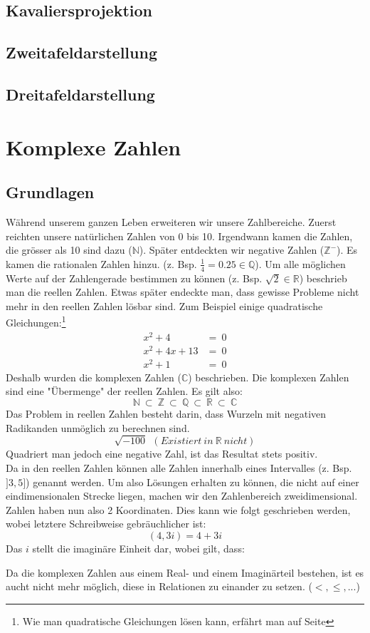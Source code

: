 \documentclass[12pt,a4paper]{scrbook}
\begin{document}
\section{Kavaliersprojektion}
\section{Zweitafeldarstellung}
\section{Dreitafeldarstellung}


\chapter{Komplexe Zahlen}
\section{Grundlagen}
Während unserem ganzen Leben erweiteren wir unsere Zahlbereiche. Zuerst
reichten unsere natürlichen Zahlen von 0 bis 10. Irgendwann kamen die Zahlen,
die grösser als 10 sind dazu ($\mathbb{N}$). Später entdeckten wir
negative Zahlen ($\mathbb{Z}^-$). Es kamen die rationalen Zahlen hinzu.
(z. Bsp. $\frac{1}{4} = 0.25 \in \mathbb{Q}$). Um alle möglichen Werte auf
der Zahlengerade bestimmen zu können (z. Bsp. $\sqrt{2} \in \mathbb{R}$)
beschrieb man die reellen Zahlen. Etwas später endeckte man, dass
gewisse Probleme nicht mehr in den reellen Zahlen lösbar sind.
Zum Beispiel einige quadratische Gleichungen:\footnote{Wie man quadratische Gleichungen lösen kann,
erfährt man auf Seite \pageref{quadratische_gleichungen}}
\begin{eqnarray*}
x^2+4 & = ~ 0\\
x^2+4x+13 & = ~ 0\\
x^2+1 & = ~ 0
\end{eqnarray*}
Deshalb wurden die komplexen Zahlen ($\mathbb{C}$) beschrieben. Die komplexen
Zahlen sind eine "Übermenge" der reellen Zahlen. Es gilt also:
\[\mathbb{N} ~ \subset ~ \mathbb{Z} ~ \subset ~ \mathbb{Q} ~ \subset ~ \mathbb{R} ~ \subset ~ \mathbb{C}\]
Das Problem in reellen Zahlen besteht darin, dass Wurzeln mit negativen
Radikanden unmöglich zu berechnen sind.
\[\sqrt{-100} ~~ (Existiert~in~\mathbb{R}~nicht)\]
Quadriert man jedoch eine negative Zahl, ist das Resultat stets positiv.\\
Da in den reellen Zahlen können alle Zahlen innerhalb eines Intervalles (z. Bsp.
$]3, 5]$) genannt werden. Um also Lösungen erhalten zu können, die nicht auf
einer eindimensionalen Strecke liegen, machen wir den Zahlenbereich zweidimensional.
Zahlen haben nun also 2 Koordinaten. Dies kann wie folgt geschrieben werden, wobei
letztere Schreibweise gebräuchlicher ist:
\[(4, 3i) = 4 + 3i\]
Das $i$ stellt die imaginäre Einheit dar, wobei gilt, dass:
\begin{center}
\fbox{\parbox{4cm}{\[i^2 = -1\]}}
\end{center}
Da die komplexen Zahlen aus einem Real- und einem Imaginärteil bestehen, ist es aucht nicht mehr möglich,
diese in Relationen zu einander zu setzen. ($<, \leq, ...$)
\end{document}
